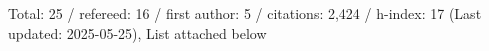 Total: 25 / refereed: 16 / first author: 5 / citations: 2,424 / h-index: 17 (Last updated: 2025-05-25), List attached below